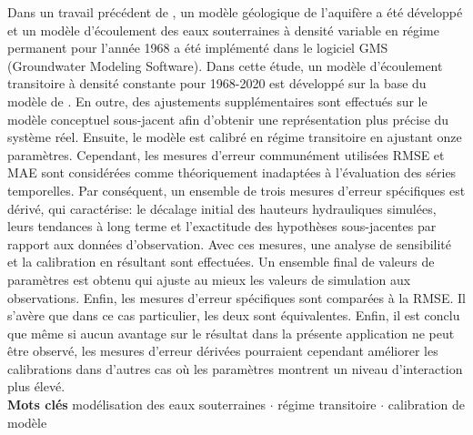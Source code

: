 Dans un travail précédent de \textcite{Horn.2021}, un modèle géologique de l'aquifère a été développé et un modèle d'écoulement des eaux souterraines à densité variable en régime permanent pour l'année 1968 a été implémenté dans le logiciel GMS (Groundwater Modeling Software). Dans cette étude, un modèle d'écoulement transitoire à densité constante pour 1968-2020 est développé sur la base du modèle de \textcite{Horn.2021}. En outre, des ajustements supplémentaires sont effectués sur le modèle conceptuel sous-jacent afin d'obtenir une représentation plus précise du système réel. Ensuite, le modèle est calibré en régime transitoire en ajustant onze paramètres. Cependant, les mesures d'erreur communément utilisées RMSE et MAE sont considérées comme théoriquement inadaptées à l'évaluation des séries temporelles. Par conséquent, un ensemble de trois mesures d'erreur spécifiques est dérivé, qui caractérise: le décalage initial des hauteurs hydrauliques simulées, leurs tendances à long terme et l'exactitude des hypothèses sous-jacentes par rapport aux données d'observation. Avec ces mesures, une analyse de sensibilité et la calibration en résultant sont effectuées. Un ensemble final de valeurs de paramètres est obtenu qui ajuste au mieux les valeurs de simulation aux observations. Enfin, les mesures d'erreur spécifiques sont comparées à la RMSE. Il s'avère que dans ce cas particulier, les deux sont équivalentes. Enfin, il est conclu que même si aucun avantage sur le résultat dans la présente application ne peut être observé, les mesures d'erreur dérivées pourraient cependant améliorer les calibrations dans d'autres cas où les paramètres montrent un niveau d'interaction plus élevé.\\[1.0cm]
\vspace{0.5cm}
\textbf{Mots clés} \hspace{0.3cm} modélisation des eaux souterraines $\cdot$ régime transitoire $\cdot$ calibration de modèle